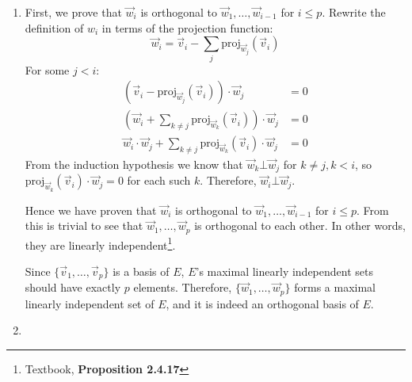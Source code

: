\documentclass{article}
\begin{document}
\maketitle

\begin{enumerate}[1.]
\item
First, we prove that $\vec{w}_i$ is orthogonal to $\vec{w}_1, \hdots, 
\vec{w}_{i-1}$ for $i \leq p$. Rewrite the definition of $w_i$ in terms of
the projection function:
\newcommand \ProjW[1]{\mathrm{proj}_{\vec{w}_{#1}}(\vec{v}_i)}
$$\vec{w}_i = \vec{v}_i - \sum_j\ProjW{j}$$
For some $j < i$:
$$
\begin{aligned}
(\vec{v}_i - \ProjW{j}) \cdot \vec{w}_j &= 0 \\
(\vec{w}_i + \sum_{k \neq j}\ProjW{k}) \cdot \vec{w}_j &= 0 \\
\vec{w}_i \cdot \vec{w}_j + \sum_{k \neq j} \ProjW{k} \cdot \vec{w}_j &= 0
\end{aligned}
$$
From the induction hypothesis we know that $\vec{w}_k \bot \vec{w}_j$ for
$k \neq j, k < i$, so $\ProjW{k} \cdot \vec{w}_j = 0$ for each such $k$.
Therefore, $\vec{w}_i \bot \vec{w}_j$.

Hence we have proven that $\vec{w}_i$ is orthogonal to $\vec{w}_1, \hdots,
\vec{w}_{i-1}$ for $i \leq p$. From this is trivial to see that $\vec{w}_1,
\hdots, \vec{w}_p$ is orthogonal to each other. In other words, they are
linearly independent\footnote{Textbook, \textbf{Proposition 2.4.17}}.

Since $\{\vec{v}_1, \hdots, \vec{v}_p\}$ is a basis of $E$, $E$'s maximal
linearly independent sets should have exactly $p$ elements. Therefore,
$\{\vec{w}_1, \hdots, \vec{w}_p\}$ forms a maximal linearly independent set of
$E$, and it is indeed an orthogonal basis of $E$. \rQED

\item
\end{enumerate}
\end{document}
